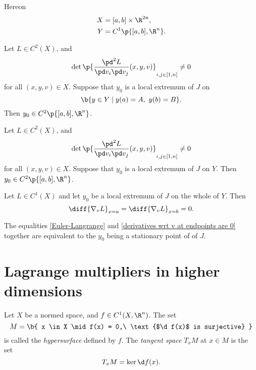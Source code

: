 Hereon
\begin{align*}
  X &= [a, b] \times \R^{2n}, \\
  Y &= C^1\p{[a, b], \R^{n}}.
\end{align*}

\begin{theorem}
  Let $L \in C^2(X)$, and
  $$ \det \p{\frac{\pd^2 L}{\pd v_i \pd v_j}(x,y,v)}_{i,j \in [1, n]} \ne 0 $$
  for all $(x, y, v) \in X$.
  Suppose that $y_0$ is a local extremum of $J$ on
  $$ \b{ y\in Y \mid y(a) = A,\ y(b) = B }. $$
  Then $y_0 \in C^2\p{[a, b], \R^n}$.
\end{theorem}

\begin{theorem}
  Let $L \in C^2(X)$, and
  $$ \det \p{\frac{\pd^2 L}{\pd v_i \pd v_j}(x,y,v)}_{i,j \in [1, n]} \ne 0 $$
  for all $(x, y, v) \in X$.
  Suppose that $y_0$ is a local extremum of $J$ on $Y$.
  Then $y_0 \in C^2\p{[a, b], \R^n}$.
\end{theorem}

\begin{theorem}
  Let $L \in C^1(X)$ and let $y_0$ be a local extremum of $J$ on the whole of $Y$. Then
  \begin{equation}
    \label{derivatives wrt v at endpoints are 0}
    \diff{\nabla_v L}_{x=a} = \diff{\nabla_v L}_{x=b} = 0.
  \end{equation}
\end{theorem}

\begin{lemma}
  The equalities \eqref{Euler-Langrange} and \eqref{derivatives wrt v at endpoints are 0} together are equivalent to the $y_0$ being a stationary point of of $J$.
\end{lemma}

\wtf

\section{Lagrange multipliers in higher dimensions}

\begin{definition}
  Let $X$ be a normed space, and $f \in C^1(X, \R^n)$.
  The set 
  $$ M = \b{ x \in X \mid f(x) = 0,\ \text{$\d f(x)$ is surjective} } $$
  is called the \emph{hypersurface} defined by $f$.
  The \emph{tangent space} $T_xM$ at $x \in M$ is the set
  $$ T_xM = \ker \d f(x). $$
\end{definition}

